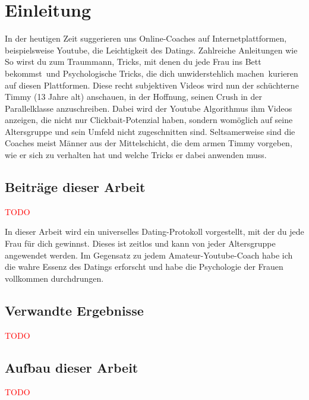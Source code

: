 \chapter{Einleitung}
\label{chapter-einleitung}

In der heutigen Zeit suggerieren uns Online-Coaches auf Internetplattformen, beispielsweise Youtube, die Leichtigkeit des Datings.
Zahlreiche Anleitungen wie \glqq So wirst du zum Traummann\grqq, \glqq Tricks, mit denen du jede Frau ins Bett bekommst\grqq~und \glqq Psychologische Tricks, die dich unwiderstehlich machen\grqq~kurieren auf diesen Plattformen.
Diese recht subjektiven Videos wird nun der schüchterne Timmy (13 Jahre alt) anschauen, in der Hoffnung, seinen Crush in der Parallelklasse anzuschreiben.
Dabei wird der Youtube Algorithmus ihm Videos anzeigen, die nicht nur Clickbait-Potenzial haben, sondern womöglich auf seine Altersgruppe und sein Umfeld nicht zugeschnitten sind.
Seltsamerweise sind die Coaches meist Männer aus der Mittelschicht, die dem armen Timmy vorgeben, wie er sich zu verhalten hat und welche Tricks er dabei anwenden muss.



\section{Beiträge dieser Arbeit}
\textcolor{red}{TODO}

In dieser Arbeit wird ein universelles Dating-Protokoll vorgestellt, mit der du jede Frau für dich gewinnst.
Dieses ist zeitlos und kann von jeder Altersgruppe angewendet werden.
Im Gegensatz zu jedem Amateur-Youtube-Coach habe ich die wahre Essenz des Datings erforscht und habe die Psychologie der Frauen vollkommen durchdrungen.



\section{Verwandte Ergebnisse}
\textcolor{red}{TODO}



\section{Aufbau dieser Arbeit}
\textcolor{red}{TODO}

